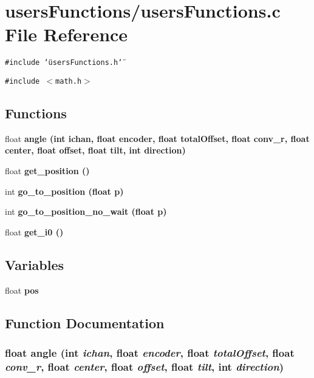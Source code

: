 \section{users\-Functions/users\-Functions.c File Reference}
\label{usersFunctions_8c}
{\tt \#include \char`\"{}users\-Functions.h\char`\"{}}\par
{\tt \#include $<$math.h$>$}\par
\subsection*{Functions}
\begin{CompactItemize}
\item 
float \bf{angle} (int ichan, float encoder, float total\-Offset, float conv\_\-r, float center, float offset, float tilt, int direction)
\item 
float \bf{get\_\-position} ()
\item 
int \bf{go\_\-to\_\-position} (float p)
\item 
int \bf{go\_\-to\_\-position\_\-no\_\-wait} (float p)
\item 
float \bf{get\_\-i0} ()
\end{CompactItemize}
\subsection*{Variables}
\begin{CompactItemize}
\item 
float \bf{pos}
\end{CompactItemize}


\subsection{Function Documentation}
\subsubsection{\setlength{\rightskip}{0pt plus 5cm}float angle (int {\em ichan}, float {\em encoder}, float {\em total\-Offset}, float {\em conv\_\-r}, float {\em center}, float {\em offset}, float {\em tilt}, int {\em direction})}\label{usersFunctions_8c_bceeb897c561346124ee40760081c47b}


